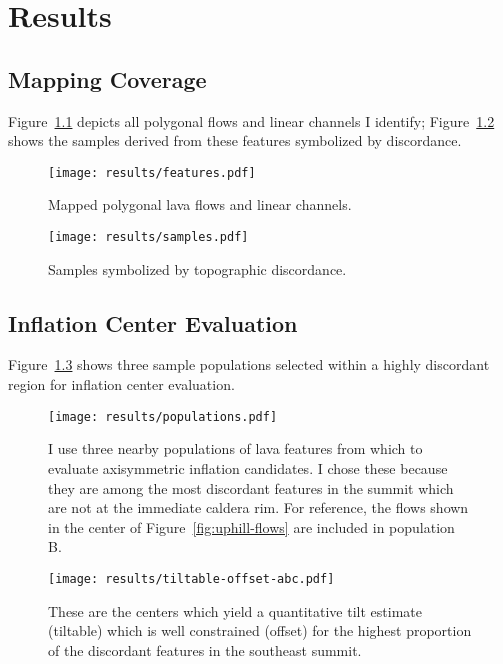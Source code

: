 \chapter{Results}\label{cha:results}

\section{Mapping Coverage}

Figure~\ref{fig:features} depicts all polygonal flows and linear channels I identify; Figure~\ref{fig:samples} shows the samples derived from these features symbolized by discordance.

\begin{figure}
    \texttt{[image: results/features.pdf]}%
    \caption[Mapped lava features]{Mapped polygonal lava flows and linear channels.}%
    \label{fig:features}
\end{figure}

\begin{figure}
    \texttt{[image: results/samples.pdf]}%
    \caption[Mapped topographic discordance]{Samples symbolized by topographic discordance.}%
    \label{fig:samples}
\end{figure}

\section{Inflation Center Evaluation}

Figure~\ref{fig:populations} shows three sample populations selected within a highly discordant region for inflation center evaluation.

\begin{figure}
    \texttt{[image: results/populations.pdf]}%
    \caption[Sample populations for inflation center evaluation]{I use three nearby populations of lava features from which to evaluate axisymmetric inflation candidates. I chose these because they are among the most discordant features in the summit which are not at the immediate caldera rim. For reference, the flows shown in the center of Figure~\ref{fig:uphill-flows} are included in population B.}%
    \label{fig:populations}
\end{figure}

\begin{figure}
    \texttt{[image: results/tiltable-offset-abc.pdf]}%
    \caption[Centers by tiltable/offset fraction]{These are the centers which yield a quantitative tilt estimate (tiltable) which is well constrained (offset) for the highest proportion of the discordant features in the southeast summit.}%
    \label{fig:tiltable-offset-abc}
\end{figure}

